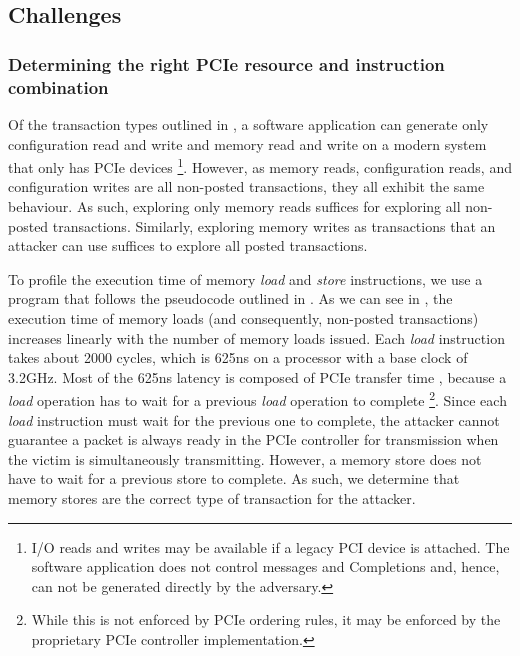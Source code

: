 \subsection{Challenges}
\label{subsec:interconnect-sc-store-ops-challenges}


\subsubsection{Determining the right PCIe resource and instruction combination}

Of the transaction types outlined in , a software application can generate only configuration read and write and memory read and write on a modern system that only has PCIe devices
\footnote{I/O reads and writes may be available if a legacy PCI device is attached.
The software application does not control messages and Completions and, hence, can not be generated directly by the adversary.}.
However, as memory reads, configuration reads, and configuration writes are all non-posted transactions, they all exhibit the same behaviour.
As such, exploring only memory reads suffices for exploring all non-posted transactions.
Similarly, exploring memory writes as transactions that an attacker can use suffices to explore all posted transactions. 


To profile the execution time of memory \textit{load} and \textit{store} instructions, we use a program that follows the pseudocode outlined in .
As we can see in , the execution time of memory loads (and consequently, non-posted transactions) increases linearly with the number of memory loads issued.
Each \textit{load} instruction takes about 2000 cycles, which is 625ns on a processor with a base clock of 3.2GHz.
Most of the 625ns latency is composed of PCIe transfer time \cite{neugebauer2018understanding}, because a \textit{load} operation has to wait for a previous \textit{load} operation to complete 
\footnote{While this is not enforced by PCIe ordering rules, it may be enforced by the proprietary PCIe controller implementation.}.
Since each \textit{load} instruction must wait for the previous one to complete, the attacker cannot guarantee a packet is always ready in the PCIe controller for transmission when the victim is simultaneously transmitting.
However, a memory store does not have to wait for a previous store to complete.
As such, we determine that memory stores are the correct type of transaction for the attacker.


